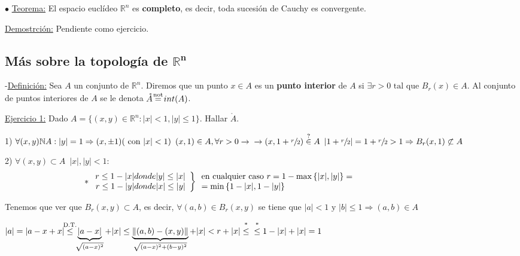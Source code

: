 \documentclass[12pt, titlepage]{article}
\newcommand{\eqc}[1]{\stackrel{\mathclap{\normalfont\mbox{\scriptsize{#1}}}}{=}}
\newcommand{\leqc}[1]{\stackrel{\mathclap{\normalfont\mbox{\scriptsize{#1}}}}{\leq}}
\newcommand{\inc}[1]{\stackrel{\mathclap{\normalfont\mbox{\scriptsize{#1}}}}{\in}}
\newcommand{\R}{\mathbb{R}}
\newcommand{\N}{\mathbb{N}}
\newcommand{\spac}{\, \, \,}
\begin{document}
\noindent $\bullet$ \underline{Teorema:} El espacio euclídeo $\R^n$ es \textbf{completo}, es decir, toda sucesión de Cauchy es convergente.
\vspace{2mm}

\underline{Demostrción:} Pendiente como ejercicio.
\vspace{5mm}

\subsection{Más sobre la topología de $\mathbf{\R^n}$}
\vspace{5mm}


-\underline{Definición:} Sea $A$ un conjunto de $\R^n$. Diremos que un punto $x \in A$  es un \textbf{punto interior} de $A$ si $\exists r > 0 \text{ tal que } B_r (x) \in A$. Al conjunto de puntos interiores de $A$ se le denota $\mathring{A} \eqc{not} int(A)$.
\vspace{3mm}

\underline{Ejercicio 1:} Dado $A = \{(x, y) \in \R^n : |x|<1, |y| \leq 1 \}$. Hallar $\mathring{A}$.
\vspace{3mm}

1) $\forall (x, y) \N A : |y| = 1 \Rightarrow (x, \pm 1) (\text{ con } |x| < 1) \spac (x, 1) \in A, \forall r > 0 \rightarrow \\ \rightarrow (x, 1 + \sfrac{r}{2}) \inc{?} A \spac |1 + \sfrac{r}{2}| = 1 + \sfrac{r}{2} > 1 \Rightarrow B_r(x, 1) \not \subset A$

2) $\forall (x, y) \subset A \spac |x|, |y| < 1$:
\[
*\left. \begin{array}{rc}

r \leq 1- |x| donde |y| \leq |x|\\
r \leq 1- |y| donde |x| \leq |y|

\end{array}\right \}\spac\parbox{10cm}{en cualquier caso $r = 1 - \max{\{|x|, |y|\}} = \\ =\min{\{1 - |x|,
 1 - |y|\}}$}
\]

Tenemos que ver que $B_r (x, y) \subset A$, es decir, $\forall (a, b) \in B_r(x, y)$ se tiene que $|a| < 1
 \text{ y } |b| \leq 1 \Rightarrow (a, b) \in A$

$|a| = |a - x + x| \leqc{D.T.} \underbrace{|a-x|}_{\sqrt{(a - x)^2}} + |x| \leq \underbrace{\|(a, b) - (x, y
)\|}_{\sqrt{(a -x)^2 + (b - y)^2}} + |x| < r + |x| \leqc{*} \\ \leqc{*} 1 - |x| +|x| =1$
\vspace{3mm}
\end{document}
